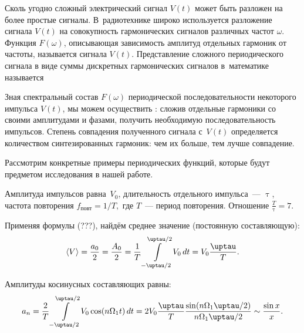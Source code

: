 


Сколь угодно сложный электрический сигнал $V(t)$ может быть разложен на более простые сигналы. В~радиотехнике широко используется разложение сигнала $V(t)$ на совокупность гармонических сигналов различных частот $\omega$. Функция $F(\omega)$, описывающая зависимость амплитуд отдельных гармоник от частоты, называется  сигнала $V(t)$. Представление сложного периодического сигнала в виде суммы дискретных гармонических сигналов в~математике называется 

Зная спектральный состав $F(\omega)$ периодической последовательности некоторого импульса $V(t)$, мы можем осуществить : сложив отдельные гармоники со своими амплитудами и фазами, получить необходимую последовательность импульсов. Степень совпадения полученного сигнала с~$V(t)$ определяется количеством синтезированных гармоник: чем их больше, тем лучше совпадение.

Рассмотрим конкретные примеры периодических функций, которые будут предметом исследования в нашей работе.

Амплитуда импульсов равна~$V_0$, длительность отдельного импульса~--- $\uptau$, частота повторения $f_{повт}=1/T,$ где $T$~--- период повторения. Отношение $\frac{T}{\uptau}=7$.

Применяя формулы (???),
найдём среднее значение (постоянную составляющую):
\begin{equation}
	\langle V \rangle = \frac{a_0}{2} = \frac{A_0}{2} = \frac{1}{T}\int\limits_{-\uptau/2}^{\uptau/2} \!V_0\,dt = V_0 \frac{\uptau}{T}.
	\eqmark{6.2.1}
\end{equation}

Амплитуды косинусных составляющих равны:
\begin{equation}
	a_n = \frac{2}{T} \int\limits_{-\uptau/2}^{\uptau/2} \!V_0\cos(n\Omega_1t)\,dt = 2V_0 \frac{\uptau}{T} \frac{\sin(n\Omega_1\uptau/2)}{n\Omega_1\uptau/2} \sim \frac{\sin x}{x}.
	\eqmark{6.2.2}
\end{equation}

